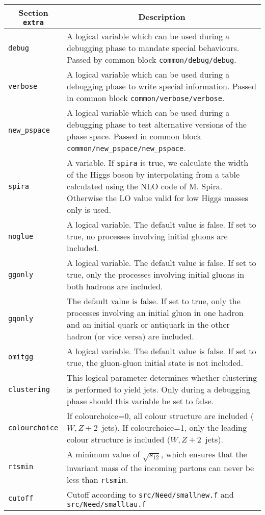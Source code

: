 	\begin{longtable}{p{1.5cm}p{12cm}}
		\toprule
		\multicolumn{1}{c}{{\textbf{Section} \texttt{extra}}} & \multicolumn{1}{c}{{\textbf{Description}}} \\ 
		\midrule
		{\tt debug} &
		A logical variable which can be used during a 
		debugging phase to mandate special behaviours. 
		Passed by common block {\tt common/debug/debug}. \\
		
		{\tt verbose} &
		A logical variable which can be used during a debugging phase to write 
		special information. Passed in common block {\tt common/verbose/verbose}. \\
		
		{\tt new\_pspace} &
		A logical variable which can be used during a debugging phase to test alternative versions of the phase space.
		Passed in common block {\tt common/new\_pspace/new\_pspace}. \\
		
		{\tt spira} & 
		A  variable. If {\tt spira} is true, we calculate the 
		width of the Higgs boson by interpolating from a table
		calculated using the NLO code of M. Spira.	Otherwise the LO value valid for low Higgs masses only is used. \\
		
		{\tt noglue} &
		A logical variable. 
		The default value is false. If set to true, no processes
		involving initial gluons are included. \\
		{\tt ggonly} &
		A logical variable. 
		The default value is false. If set to true, 
		only the processes
		involving initial gluons in both hadrons are included.\\
		{\tt gqonly} &
		The default value is false. If set to true, 
		only the processes
		involving an initial gluon in one hadron and an initial quark
		or antiquark in the other hadron (or vice versa) are included.\\
		{\tt omitgg} &
		A logical variable. 
		The default value is false. If set to true, the gluon-gluon
		initial state is not included.\\
		
		{\tt clustering} &
		This logical parameter determines whether clustering is performed to yield
		jets. Only during a debugging phase should this variable be set to false. \\
		
		{\tt colourchoice} &
		If colourchoice=0, all colour structure are included ($W,Z+2$~jets).
		If colourchoice=1, only the leading 
		colour structure is included ($W,Z+2$~jets). \\
		
		{\tt rtsmin} &
		A minimum value of $\sqrt{s_{12}}$, which ensures that the invariant mass
		of the incoming partons can never be less than {\tt rtsmin}. \\
		
		
		{\tt cutoff} & Cutoff according to \texttt{src/Need/smallnew.f} and
		\texttt{src/Need/smalltau.f} \\
		\bottomrule
	\end{longtable}

